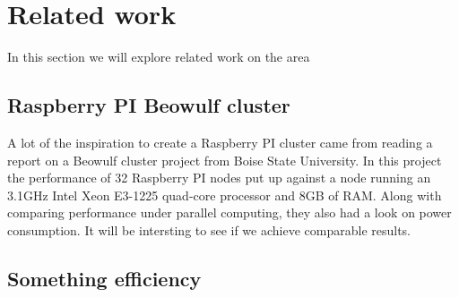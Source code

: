 \clearpage
\section{Related work}
In this section we will explore related work on the area
\subsection{Raspberry PI Beowulf cluster}
A lot of the inspiration to create a Raspberry PI cluster came from reading a report on a Beowulf cluster project from Boise State University.\cite{RPI_BEOWULF} In this project the performance of 32 Raspberry PI nodes put up against a node running an 3.1GHz Intel Xeon E3-1225 quad-core processor and 8GB of RAM. Along with comparing performance under parallel computing, they also had a look on power consumption. It will be intersting to see if we achieve comparable results. 

\subsection{Something efficiency}
